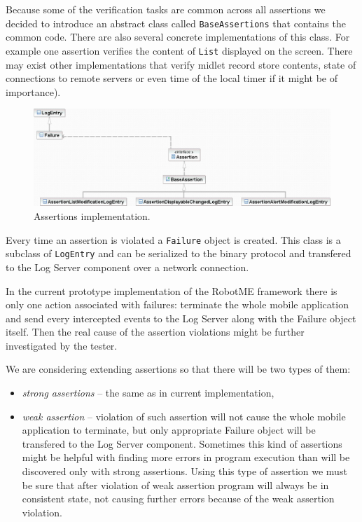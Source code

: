 Because some of the verification tasks are common across all assertions
we decided to introduce an abstract class called \texttt{BaseAssertions}
that contains the common code. There are also several concrete implementations
of this class. For example one assertion verifies the content of \texttt{List} displayed on the screen.
There may exist other implementations that verify midlet record store contents, state of connections
to remote servers or even time of the local timer if it might be of importance).

\begin{figure}[t]%
\begin{center}
\includegraphics[width=\linewidth]{figures/uml-diagram-assertions}
\end{center}
\caption{Assertions implementation.}%
\label{fig:uml-diagram-assertions}
\end{figure}

Every time an assertion is violated a \texttt{Failure} object is created. This class is a subclass of
\texttt{LogEntry} and can be serialized to the binary protocol and transfered to the
Log Server component over a network connection. 

In the current prototype implementation of the RobotME framework there is only one action associated with
failures: terminate the whole mobile application and send every intercepted events to the
Log Server along with the Failure object itself. Then the real cause of the assertion
violations might be further investigated by the tester.

We are considering extending assertions so that there will be two types of them:
\begin{itemize}
    \item \emph{strong assertions} -- the same as in current implementation,
    \item \emph{weak assertion} -- violation of such assertion will not cause the whole mobile
  application to terminate, but only appropriate Failure object will be 
  transfered to the Log Server component. Sometimes this kind of assertions might
  be helpful with finding more errors in program execution than will be discovered
  only with strong assertions. Using this type of assertion we must be sure that after violation of
  weak assertion program will always be in consistent state, not causing
  further errors because of the weak assertion violation.
\end{itemize}
